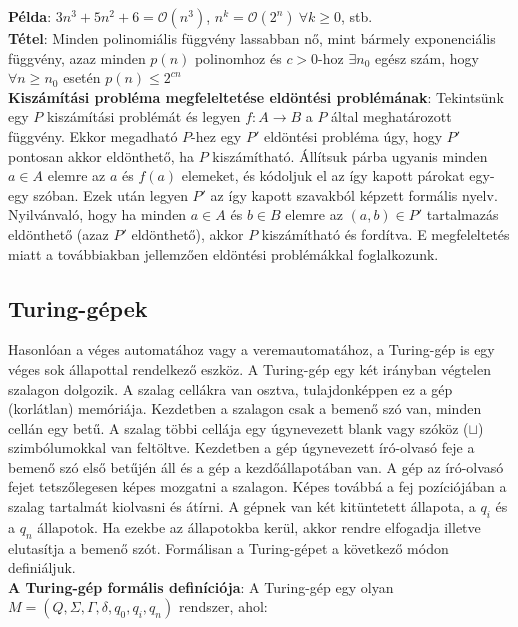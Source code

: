 \documentclass[margin=0px]{article}
\begin{document}
	\noindent \textbf{Példa}: $3n^{3} + 5n^{2} + 6 = \mathcal{O}(n^{3})$, $n^{k} = \mathcal{O}(2^{n}) \ \forall k \geq 0$, stb.\\
	
	\noindent \textbf{Tétel}: Minden polinomiális függvény lassabban nő, mint bármely exponenciális függvény,
	azaz minden $p(n)$ polinomhoz és $c>0$-hoz $\exists n_{0}$ egész szám, hogy $\forall n \geq n_{0}$ esetén $p(n) \leq 2^{cn}$\\
	
	\noindent \textbf{Kiszámítási probléma megfeleltetése eldöntési problémának}: Tekintsünk egy $P$ kiszámítási problémát
	és legyen $f: A \to B$ a $P$ által meghatározott függvény. Ekkor megadható $P$-hez egy $P'$ eldöntési probléma úgy, hogy
	$P'$ pontosan akkor eldönthető, ha $P$ kiszámítható. Állítsuk párba ugyanis minden $a \in A$ elemre az $a$ és $f(a)$ elemeket,
	és kódoljuk el az így kapott párokat egy-egy szóban. Ezek után legyen $P'$ az így kapott szavakból képzett formális nyelv.
	Nyilvánvaló, hogy ha minden $a \in A$ és $b \in B$ elemre az $(a,b) \in P'$ tartalmazás eldönthető (azaz $P'$ eldönthető), akkor
	$P$ kiszámítható és fordítva.	
	E megfeleltetés miatt a továbbiakban jellemzően eldöntési problémákkal foglalkozunk.
	
	\subsection{Turing-gépek}
	
	Hasonlóan a véges automatához vagy a veremautomatához, a Turing-gép is
	egy véges sok állapottal rendelkező eszköz. A Turing-gép egy két irányban
	végtelen szalagon dolgozik. A szalag cellákra van osztva, tulajdonképpen ez
	a gép (korlátlan) memóriája. Kezdetben a szalagon csak a bemenő szó van,
	minden cellán egy betű. A szalag többi cellája egy úgynevezett blank vagy
	szóköz ($\sqcup$) szimbólumokkal van feltöltve. Kezdetben a gép úgynevezett író-olvasó
	feje a bemenő szó első betűjén áll és a gép a kezdőállapotában van.
	A gép az író-olvasó fejet tetszőlegesen képes mozgatni a szalagon. Képes továbbá
	a fej pozíciójában a szalag tartalmát kiolvasni és átírni. A gépnek van két
	kitüntetett állapota, a $q_{i}$ és a $q_{n}$ állapotok. Ha ezekbe az állapotokba kerül,
	akkor rendre elfogadja illetve elutasítja a bemenő szót.
	Formálisan a Turing-gépet a következő módon definiáljuk.\\
	
	\noindent \textbf{A Turing-gép formális definíciója}: A Turing-gép egy olyan
	$M = (Q, \Sigma, \Gamma, \delta, q_{0}, q_{i}, q_{n})$ rendszer, ahol:
	
\end{document}
